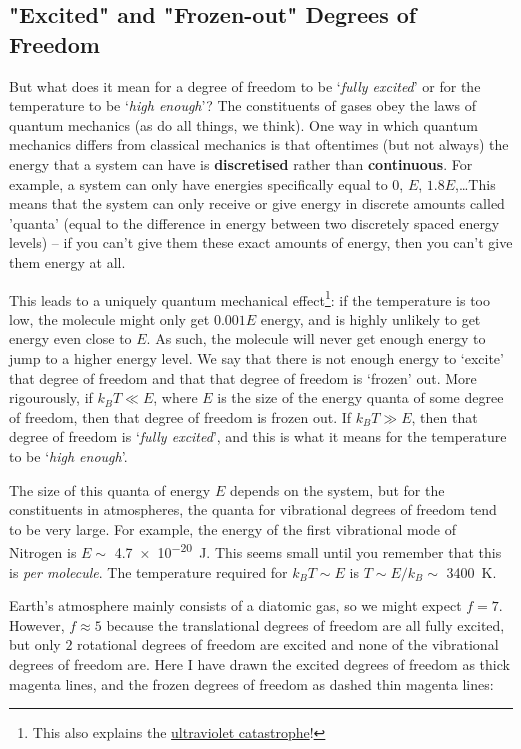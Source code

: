 \subsection{"Excited" and "Frozen-out" Degrees of Freedom}

But what does it mean for a degree of freedom to be `\textit{fully excited}' or for the temperature to be `\textit{high enough}'? The constituents of gases obey the laws of quantum mechanics (as do all things, we think). One way in which quantum mechanics differs from classical mechanics is that oftentimes (but not always) the energy that a system can have is \textbf{discretised} rather than \textbf{continuous}. For example, a system can only have energies specifically equal to $0$, $E$, $1.8E$,\ldots This means that the system can only receive or give energy in discrete amounts called 'quanta' (equal to the difference in energy between two discretely spaced energy levels) – if you can't give them these exact amounts of energy, then you can't give them energy at all.

This leads to a uniquely quantum mechanical effect\footnote{
    This also explains the \href{https://en.wikipedia.org/wiki/Ultraviolet_catastrophe}{ultraviolet catastrophe}!
}: if the temperature is too low, the molecule might only get $0.001E$ energy, and is highly unlikely to get energy even close to $E$. As such, the molecule will never get enough energy to jump to a higher energy level. We say that there is not enough energy to `excite' that degree of freedom and that that degree of freedom is `frozen' out. More rigourously, if $k_BT\ll E$, where $E$ is the size of the energy quanta of some degree of freedom, then that degree of freedom is frozen out. If $k_BT\gg E$, then that degree of freedom is `\textit{fully excited}', and this is what it means for the temperature to be `\textit{high enough}'.

The size of this quanta of energy $E$ depends on the system, but for the constituents in atmospheres, the quanta for vibrational degrees of freedom tend to be very large. For example, the energy of the first vibrational mode of Nitrogen is $E\sim$ \qty{4.7e-20}{\joule}. This seems small until you remember that this is \textit{per molecule}. The temperature required for $k_BT\sim E$ is $T\sim E/k_B\sim$ \qty{3400}{\kelvin}.

Earth's atmosphere mainly consists of a diatomic gas, so we might expect $f=7$. However, $f\approx5$ because the translational degrees of freedom are all fully excited, but only $2$ rotational degrees of freedom are excited and none of the vibrational degrees of freedom are. Here I have drawn the excited degrees of freedom as thick magenta lines, and the frozen degrees of freedom as dashed thin magenta lines:

